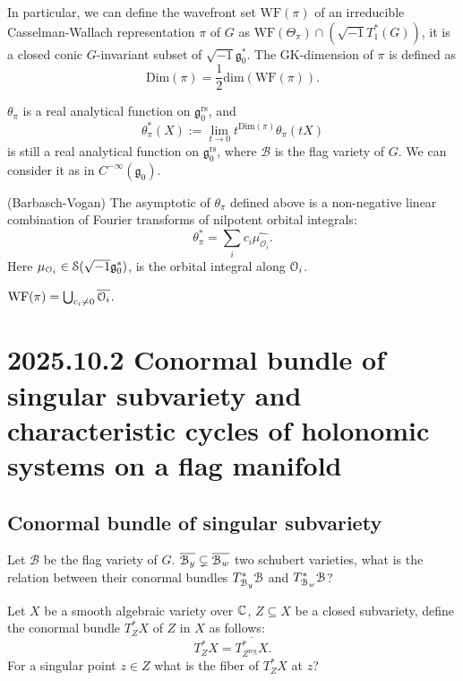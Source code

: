 \documentclass[12pt]{amsart}
\numberwithin{equation}{section}
\newcommand{\fg}{\mathfrak{g}} \newcommand{\fh}{\mathfrak{h}} \newcommand{\fk}{\mathfrak{k}}
\renewcommand{\bar}{\overline}
\renewcommand{\hat}{\widehat}
\begin{document}
In particular, we can define the wavefront set $\mathrm{WF}(\pi)$ of an irreducible Casselman-Wallach representation $\pi$ of $G$ as $\mathrm{WF}(\Theta_{\pi}) \cap (\sqrt{-1}T^*_1(G))$, it is a closed conic $G$-invariant subset of $\sqrt{-1}\fg_0^*$. The GK-dimension of $\pi$ is defined as
\[\mathrm{Dim}(\pi) = \frac{1}{2}\mathrm{dim}(\mathrm{WF}(\pi)).\] 

$\theta_{\pi}$ is a real analytical function on $\fg_0^{\mathrm{rs}}$, and
\[ \theta^{*}_{\pi}(X) :=  \lim_{t \to 0}t^{\mathrm{Dim}(\pi)}\theta_{\pi}(tX)\]
is still a real analytical function on $\fg_0^{\mathrm{rs}}$, where $\mathcal{B}$ is the flag variety of $G$. We can consider it as in $C^{-\infty}(\fg_0)$.

\begin{thm}(Barbasch-Vogan)
     The asymptotic of $\theta_{\pi}$ defined above is a non-negative linear combination of Fourier transforms of nilpotent orbital integrals:
      \[
          \theta^*_{\pi} = \sum_{i} c_i \hat{\mu_{\mathcal{O}_i}}.
      \]
      Here $\mu_{\CO_i} \in \mathcal{S}(\sqrt{-1}\fg_0^*)$, is the orbital integral along ${\mathcal {O}}_i$.
\end{thm}

$\mathrm{WF}(\pi) = \bigcup_{c_i \neq 0} \bar{\CO_i}$.



\section{2025.10.2 Conormal bundle of singular subvariety and characteristic cycles of holonomic systems on a flag manifold}


\subsection{Conormal bundle of singular subvariety}

Let $\mathcal{B}$ be the flag variety of $G$. $\bar{\CB_y} \subsetneq \bar{\CB_w}$ two schubert varieties, what is the relation between their conormal bundles $T^*_{{\mathcal {B}}_y}{\mathcal {B}}$ and $T^*_{{\mathcal {B}}_w}{\mathcal {B}}$?

Let $X$ be a smooth algebraic variety over ${\mathbb {C}}$, $Z \subseteq X$ be a closed subvariety, define the conormal bundle $T^*_Z X$ of $Z$ in $X$ as follows:
\[T^*_Z X = \bar{T^*_{Z^{\mathrm{reg}}}X} .\]
For a singular point $z \in Z$ what is the fiber of $T^*_Z X$ at $z$?
\end{document}
